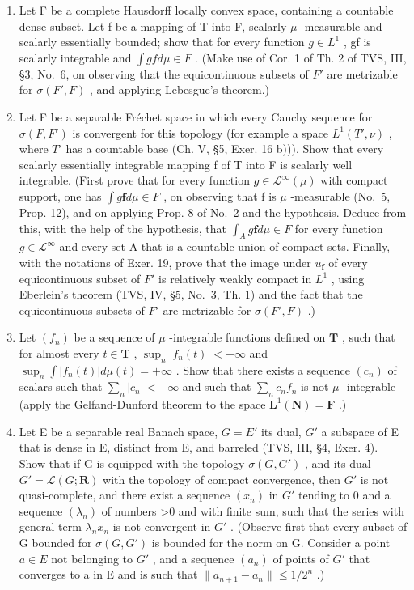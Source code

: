 \begin{enumerate}
\def\labelenumi{\arabic{enumi})}
\setcounter{enumi}{23}
\item
  Let F be a complete Hausdorff locally convex space, containing a countable dense subset. Let f be a mapping of T into F, scalarly \(\mu\) -measurable and scalarly essentially bounded; show that for every function \(g \in L^{1}\) , gf is scalarly integrable and \(\int g f d\mu \in F\) . (Make use of Cor. 1 of Th. 2 of TVS, III, §3, No.~6, on observing that the equicontinuous subsets of \(F'\) are metrizable for \(\sigma(F', F)\) , and applying Lebesgue's theorem.)
\item
  Let F be a separable Fréchet space in which every Cauchy sequence for \(\sigma(F, F')\) is convergent for this topology (for example a space \(L^1(T', \nu)\) , where \(T'\) has a countable base (Ch. V, §5, Exer. 16 b))). Show that every scalarly essentially integrable mapping f of T into F is scalarly well integrable. (First prove that for every function \(g \in \mathcal{L}^\infty(\mu)\) with compact support, one has \(\int g\mathbf{f} d\mu \in F\) , on observing that f is \(\mu\) -measurable (No.~5, Prop. 12), and on applying Prop. 8 of No.~2 and the hypothesis. Deduce from this, with the help of the hypothesis, that \(\int_A g\mathbf{f} d\mu \in F\) for every function \(g \in \mathcal{L}^\infty\) and every set A that is a countable union of compact sets. Finally, with the notations of Exer. 19, prove that the image under \(u_{\mathbf{f}}\) of every equicontinuous subset of \(F'\) is relatively weakly compact in \(L^1\) , using Eberlein's theorem (TVS, IV, §5, No.~3, Th. 1) and the fact that the equicontinuous subsets of \(F'\) are metrizable for \(\sigma(F', F)\) .)
\item
  Let \((f_n)\) be a sequence of \(\mu\) -integrable functions defined on \(\mathbf{T}\) , such that for almost every \(t \in \mathbf{T}\) , \(\sup_{n} |f_n(t)| < +\infty\) and \(\sup_{n} \int |f_n(t)| d\mu(t) = +\infty\) . Show that there exists a sequence \((c_n)\) of scalars such that \(\sum_{n} |c_n| < +\infty\) and such that \(\sum_{n} c_n f_n\) is not \(\mu\) -integrable (apply the Gelfand-Dunford theorem to the space \(\mathbf{L}^1(\mathbf{N}) = \mathbf{F}\) .)
\item
  Let E be a separable real Banach space, \(G = E'\) its dual, \(G'\) a subspace of E that is dense in E, distinct from E, and barreled (TVS, III, §4, Exer. 4). Show that if G is equipped with the topology \(\sigma(G, G')\) , and its dual \(G' = \mathcal{L}(G; \mathbf{R})\) with the topology of compact convergence, then \(G'\) is not quasi-complete, and there exist a sequence \((x_n)\) in \(G'\) tending to 0 and a sequence \((\lambda_n)\) of numbers \textgreater0 and with finite sum, such that the series with general term \(\lambda_n x_n\) is not convergent in \(G'\) . (Observe first that every subset of G bounded for \(\sigma(G, G')\) is bounded for the norm on G. Consider a point \(a \in E\) not belonging to \(G'\) , and a sequence \((a_n)\) of points of \(G'\) that converges to a in E and is such that \(\|a_{n+1} - a_n\| \leqslant 1/2^n\) .)
\end{enumerate}

\setcounter{exercisegroup}{2}
\edef\CurrentExerciseGroup{\arabic{exercisegroup}}
